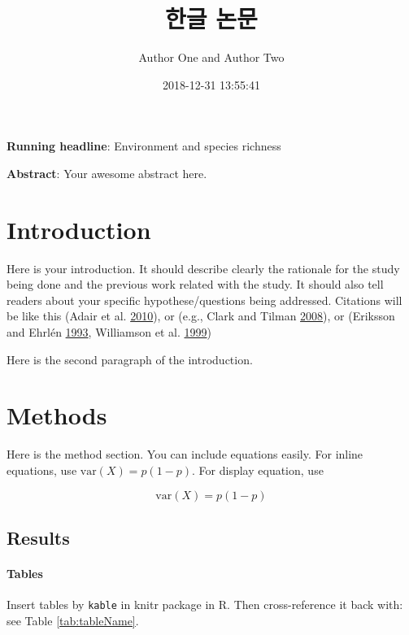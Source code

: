 \documentclass[12pt,]{article}
\title{한글 논문}
\author{Author One and Author Two}
\date{2018-12-31 13:55:41}
\makeatletter
\let\oldparagraph\paragraph
\renewcommand{\paragraph}[1]{\oldparagraph{#1}\mbox{}}
\newcommand\iraggedright{%
  \let\\\@centercr\@rightskip\@flushglue \rightskip\@rightskip
  \leftskip\z@skip}
\makeatother
\begin{document}
\maketitle

\iraggedright

\textbf{Running headline}: Environment and species richness

\textbf{Abstract}: Your awesome abstract here.

\clearpage

\hypertarget{introduction}{%
\section{Introduction}\label{introduction}}

Here is your introduction. It should describe clearly the rationale for
the study being done and the previous work related with the study. It
should also tell readers about your specific hypothese/questions being
addressed. Citations will be like this (Adair et al.
\protect\hyperlink{ref-adair_single-pool_2010}{2010}), or (e.g., Clark
and Tilman \protect\hyperlink{ref-clark_loss_2008}{2008}), or (Eriksson
and Ehrlén \protect\hyperlink{ref-eriksson_seed_1993}{1993}, Williamson
et al. \protect\hyperlink{ref-williamson_dissolved_1999}{1999})

Here is the second paragraph of the introduction.

\hypertarget{methods}{%
\section{Methods}\label{methods}}

Here is the method section. You can include equations easily. For inline
equations, use \(\text{var}(X) = p(1-p)\). For display equation, use

\[\text{var}(X) = p(1-p)\]

\hypertarget{results}{%
\subsection{Results}\label{results}}

\hypertarget{tables}{%
\paragraph{Tables}\label{tables}}

Insert tables by \texttt{kable} in knitr package in R. Then
cross-reference it back with: see Table \ref{tab:tableName}.
\end{document}
